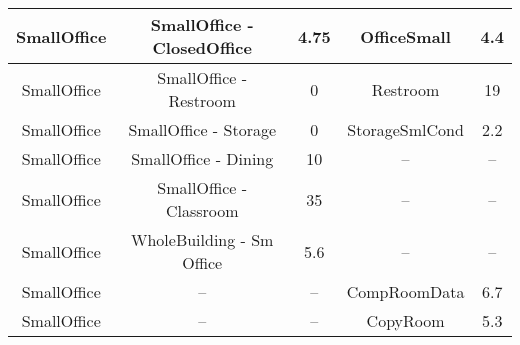 \begin{table}
\begin{tabular}{|c|c|c|c|c|}
SmallOffice            & SmallOffice - ClosedOffice   & 4.75                                                                                                          & OfficeSmall                       & 4.4                                                                                                            \\ \hline
SmallOffice            & SmallOffice - Restroom       & 0                                                                                                             & Restroom                          & 19                                                                                                             \\ \hline
SmallOffice            & SmallOffice - Storage        & 0                                                                                                             & StorageSmlCond                    & 2.2                                                                                                            \\ \hline
SmallOffice            & SmallOffice - Dining         & 10                                                                                                            & --                                & --                                                                                                             \\ \hline
SmallOffice            & SmallOffice - Classroom      & 35                                                                                                            & --                                & --                                                                                                             \\ \hline
SmallOffice            & WholeBuilding - Sm Office    & 5.6                                                                                                           & --                                & --                                                                                                             \\ \hline
SmallOffice            & --                           & --                                                                                                            & CompRoomData                      & 6.7                                                                                                            \\ \hline
SmallOffice            & --                           & --                                                                                                            & CopyRoom                          & 5.3                                                                                                            \\ \hline
\end{tabular}
\end{table}